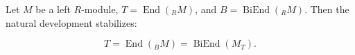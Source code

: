 Let $M$ be a left $R$-module, $T = \operatorname{End}(_R M)$, and $B = \operatorname{BiEnd}(_R M)$. Then the natural development stabilizes:

$$T = \operatorname{End}(_B M) = \operatorname{BiEnd}(M_T).$$
